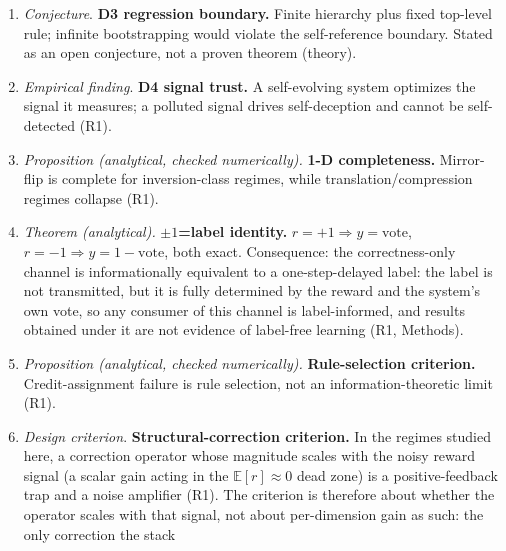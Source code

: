 \documentclass[preprint,12pt]{elsarticle}
\begin{document}
\begin{enumerate}[label=\arabic*.]
changes slower than its observation scale, because a first-order low-pass
estimate cannot follow a change faster than its own time constant
\cite{haykin2002}; the statement is a bandwidth property of the estimator
rather than a theorem about the system, and the measured form for this stack is
a monotone
recovery transition band at
$\tau_{\mathrm{env}}/\tau_2\approx1$--$2$ (empirical, this substrate, sampled
at eleven ratios with five of them inside $[1,2]$, so the band is bracketed by
measured points),
quantitatively $\tau_{\mathrm{env}}\gtrsim$ the flip-plus-confirmation pipeline latency of $60$
blocks $=1.2\,\tau_2$, which is the same constraint (R6).
\item \emph{Conjecture}. \textbf{D3 regression boundary.} Finite hierarchy plus
fixed top-level rule; infinite bootstrapping would violate the
self-reference boundary. Stated as an open conjecture, not a proven
theorem (theory).
\item \emph{Empirical finding}. \textbf{D4 signal trust.} A self-evolving system optimizes the signal
it measures; a polluted signal drives self-deception and cannot be
self-detected (R1).
\item \emph{Proposition (analytical, checked numerically).} \textbf{1-D completeness.} Mirror-flip is complete for
inversion-class regimes, while translation/compression regimes collapse
(R1).
\item \emph{Theorem (analytical).} \textbf{$\pm1$=label identity.} $r=+1\Rightarrow y=\mathrm{vote}$,
$r=-1\Rightarrow y=1-\mathrm{vote}$, both exact. Consequence: the
correctness-only channel is informationally equivalent to a one-step-delayed
label: the label is not transmitted, but it is fully determined by the
reward and the system's own vote, so any consumer of this channel is
label-informed, and results obtained under it are not evidence of
label-free learning (R1, Methods).
\item \emph{Proposition (analytical, checked numerically).} \textbf{Rule-selection criterion.} Credit-assignment failure is rule
selection, not an information-theoretic limit (R1).
\item \emph{Design criterion}. \textbf{Structural-correction criterion.} In the
regimes studied here, a correction operator whose magnitude scales with the
noisy reward signal (a scalar gain acting in the $\mathbb E[r]\approx0$
dead zone) is a positive-feedback trap and a noise amplifier (R1). The
criterion is therefore about whether the operator scales with that signal,
not about per-dimension gain as such: the only correction the stack

\end{enumerate}
\end{document}

